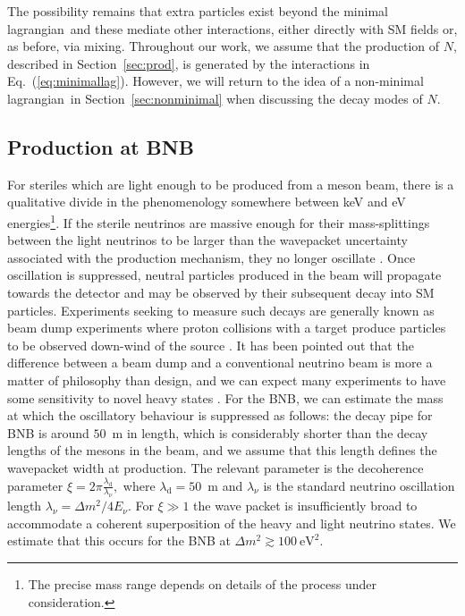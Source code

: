 \documentclass[11pt, a4paper]{article}
\newcommand{\refeq}[1]{Eq.~(\ref{#1})}
\newcommand{\refsec}[1]{Section~\ref{#1}}
\def\lagrangian{lagrangian}
\begin{document}
The possibility remains that extra particles exist beyond the minimal
\lagrangian\ and these mediate other interactions, either directly with SM
fields or, as before, via mixing. 
%
Throughout our work, we assume that the production of $N$, described in
\refsec{sec:prod}, is generated by the interactions in \refeq{eq:minimallag}.
However, we will return to the idea of a non-minimal \lagrangian\ in
\refsec{sec:nonminimal} when discussing the decay modes of $N$.

\subsection{\label{sec:prod}Production at BNB}

For steriles which are light enough to be produced from a meson beam, there is
a qualitative divide in the phenomenology somewhere between keV and eV
energies\footnote{The precise mass range depends on details of the process
under consideration.}. If the sterile neutrinos are massive enough for their
mass-splittings between the light neutrinos to be larger than the wavepacket
uncertainty associated with the production mechanism, they no longer oscillate
\cite{Akhmedov:2009rb}.  
%
Once oscillation is suppressed, neutral particles produced in the beam will
propagate towards the detector and may be observed by their subsequent decay
into SM particles. Experiments seeking to measure such decays are generally
known as beam dump experiments where proton collisions with a target produce
particles to be observed down-wind of the source \cite{CooperSarkar:1985nh,
Bergsma:1985is, Vaitaitis:1999wq, Bernardi:1985ny, Bernardi:1987ek,
Anelli:2015pba, Alekhin:2015byh}. It has been pointed out that the difference
between a beam dump and a conventional neutrino beam is more a matter of
philosophy than design, and we can expect many experiments to have some
sensitivity to novel heavy states \cite{Gorbunov:2007ak, Asaka:2012bb,
Adams:2013qkq}. 
%
For the BNB, we can estimate the mass at which the oscillatory behaviour is
suppressed as follows: the decay pipe for BNB is around $50$~m in length, which
is considerably shorter than the decay lengths of the mesons in the beam, and
we assume that this length defines the wavepacket width at production.  The
relevant parameter is the decoherence parameter \cite{Akhmedov:2009rb,
Hernandez:2011rs}
%
$\xi = 2\pi \frac{\lambda_\text{d}}{\lambda_\nu},$
%
where $\lambda_\text{d} = 50$~m and $\lambda_\nu$ is the standard neutrino
oscillation length $\lambda_\nu = \Delta m^2/4E_\nu$. For $\xi\gg1$ the wave
packet is insufficiently broad to accommodate a coherent superposition of the
heavy and light neutrino states. We estimate that this occurs for the BNB at 
%
$ \Delta m^2 \gtrsim 100~\text{eV}^2.$
%
\end{document}
